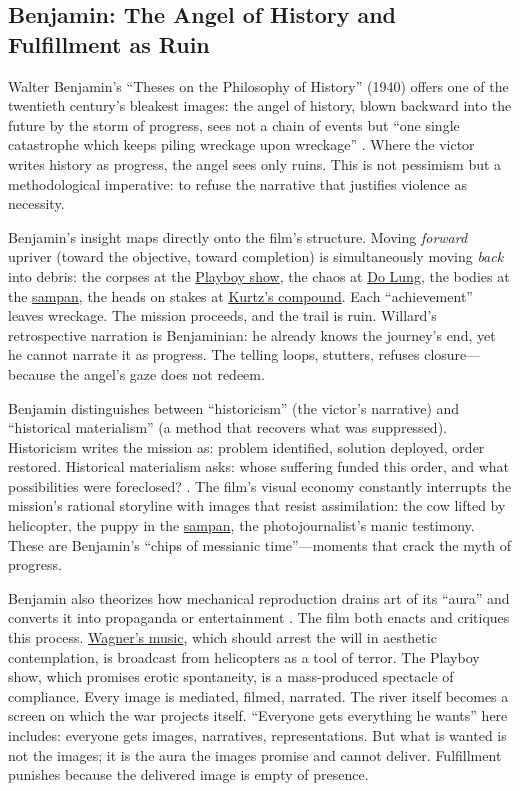 \subsection*{Benjamin: The Angel of History and Fulfillment as Ruin}
\label{ssec:v-benjamin}
Walter Benjamin's ``Theses on the Philosophy of History'' (1940) offers one of the twentieth
century's bleakest images: the angel of history, blown backward into the future by the storm
of progress, sees not a chain of events but ``one single catastrophe which keeps piling
wreckage upon wreckage'' \parencite{BenjaminTheses1969}. Where the victor writes history as
progress, the angel sees only ruins. This is not pessimism but a methodological imperative: to
refuse the narrative that justifies violence as necessity.

Benjamin's insight maps directly onto the film's structure. Moving \emph{forward} upriver
(toward the objective, toward completion) is simultaneously moving \emph{back} into debris:
the corpses at the \hyperref[scene:playboy-show]{Playboy show}, the chaos at
\hyperref[scene:do-lung-bridge]{Do Lung}, the bodies at the \hyperref[scene:sampan]{sampan},
the heads on stakes at \hyperref[scene:kurtz-compound]{Kurtz's compound}. Each ``achievement''
leaves wreckage. The mission proceeds, and the trail is ruin. Willard's retrospective narration
is Benjaminian: he already knows the journey's end, yet he cannot narrate it as progress. The
telling loops, stutters, refuses closure---because the angel's gaze does not redeem.

Benjamin distinguishes between ``historicism'' (the victor's narrative) and ``historical
materialism'' (a method that recovers what was suppressed). Historicism writes the mission as:
problem identified, solution deployed, order restored. Historical materialism asks: whose
suffering funded this order, and what possibilities were foreclosed?
\parencite{BenjaminTheses1969}. The film's visual economy constantly interrupts the mission's
rational storyline with images that resist assimilation: the cow lifted by helicopter, the
puppy in the \hyperref[scene:sampan]{sampan}, the photojournalist's manic testimony. These are
Benjamin's ``chips of messianic time''---moments that crack the myth of progress.

Benjamin also theorizes how mechanical reproduction drains art of its ``aura'' and converts it
into propaganda or entertainment \parencite{BenjaminArtwork1969}. The film both enacts and
critiques this process. \hyperref[scene:kilgore-beach]{Wagner's music}, which should arrest the
will in aesthetic contemplation, is broadcast from helicopters as a tool of terror. The
Playboy show, which
promises erotic spontaneity, is a mass-produced spectacle of compliance. Every image is
mediated, filmed, narrated. The river itself becomes a screen on which the war projects itself.
``Everyone gets everything he wants'' here includes: everyone gets images, narratives,
representations. But what is wanted is not the images; it is the aura the images promise and
cannot deliver. Fulfillment punishes because the delivered image is empty of presence.

